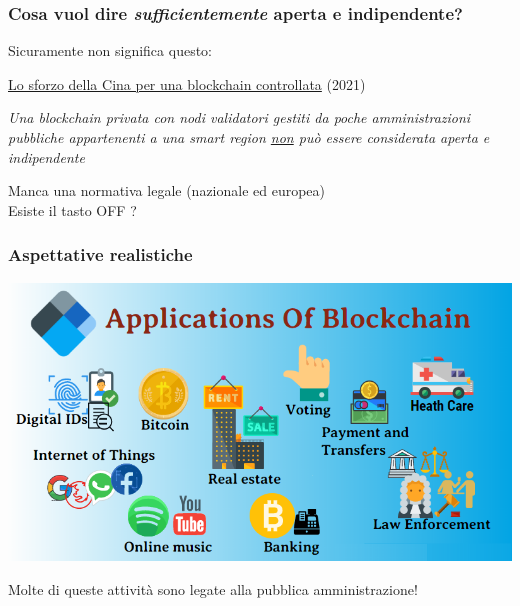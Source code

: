 \documentclass[11pt]{beamer}  %
\begin{document}
\begin{frame}\frametitle{Cosa vuol dire \emph{sufficientemente} aperta e indipendente?}

  Sicuramente non significa questo:
  \begin{center}
    \href{https://www.coindesk.com/china-to-create-it-can-control}{Lo sforzo della Cina per una blockchain controllata} (2021)
  \end{center}

  \medskip

  \begin{center}
    {\color{red}\emph{Una blockchain privata con nodi validatori gestiti da poche amministrazioni pubbliche appartenenti a una smart region
    \underline{non} pu\`o essere considerata aperta e indipendente}}
  \end{center}

  \medskip

  \begin{center}
    {\color{blue}{Si potrebbe immaginare una blockchain a livello europeo, con regole di ingresso e selezione di nodi validatori applicabili
    sia a societ\`a private che ad amministrazioni pubbliche degli Stati membri, con meccanismi premiali e di rotazione imposti da smart contract}}
  \end{center}

  \medskip

  \begin{center}
    Manca una normativa legale (nazionale ed europea)\\
    Esiste il tasto OFF ?
  \end{center}
  
\end{frame}

\begin{frame}\frametitle{Aspettative realistiche}

  \begin{center}
    \includegraphics[scale=0.4,clip=false]{pictures/blockchain-applications.png}
  \end{center}

  \begin{center}
    Molte di queste attivit\`a sono legate alla pubblica amministrazione!
  \end{center}
  
\end{frame}
\end{document}
